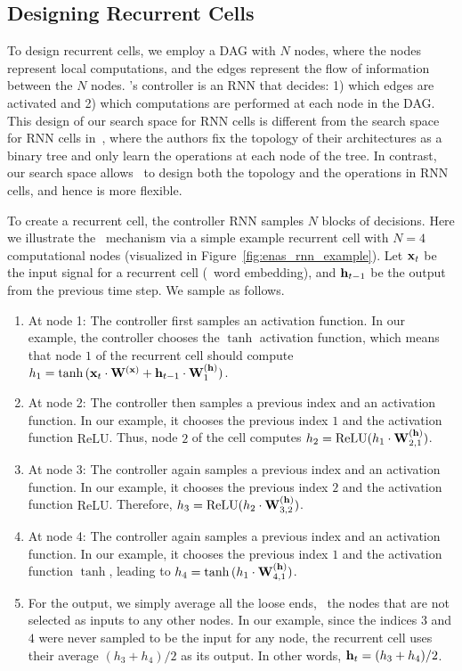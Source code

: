 \subsection{\label{sec:enas_rnn}Designing Recurrent Cells}
To design recurrent cells, we employ a DAG with $N$ nodes, where the nodes represent local computations, and the edges represent the flow of information between the $N$ nodes. \enas's controller is an RNN that decides: 1) which edges are activated and 2) which computations are performed at each node in the DAG. This design of our search space for RNN cells is different from the search space for RNN cells in~\citet{nas}, where the authors fix the topology of their architectures as a binary tree and only learn the operations at each node of the tree. In contrast, our search space allows \enas~to design both the topology and the operations in RNN cells, and hence is more flexible.

To create a recurrent cell, the controller RNN samples $N$ blocks of decisions. Here we illustrate the \enas~mechanism via a simple example recurrent cell with $N = 4$ computational nodes (visualized in Figure~\ref{fig:enas_rnn_example}). Let $\mathbf{x}_t$ be the input signal for a recurrent cell (\eg~word embedding), and $\mathbf{h}_{t-1}$ be the output from the previous time step. We sample as follows.
\begin{enumerate}
  \small
  \item At node 1: The controller first samples an activation function. In our example, the controller chooses the $\tanh$ activation function, which means that node $1$ of the recurrent cell should compute $h_1 = \tanh{(\mathbf{x}_t \cdot \mathbf{W}^{(\mathbf{x})} + \mathbf{h}_{t-1} \cdot \mathbf{W}^{(\mathbf{h})}_1)}$.
  \item At node 2: The controller then samples a previous index and an activation function. In our example, it chooses the previous index $1$ and the activation function $\text{ReLU}$. Thus, node $2$ of the cell computes $h_2 = \text{ReLU}(h_1 \cdot \mathbf{W}^{(\mathbf{h})}_{2, 1})$.
  \item At node 3: The controller again samples a previous index and an activation function. In our example, it chooses the previous index $2$ and the activation function $\text{ReLU}$. Therefore, $h_3 = \text{ReLU}(h_2 \cdot \mathbf{W}^{(\mathbf{h})}_{3, 2})$.
  \item At node 4: The controller again samples a previous index and an activation function. In our example, it chooses the previous index $1$ and the activation function $\tanh$, leading to $h_4 = \tanh{(h_1 \cdot \mathbf{W}^{(\mathbf{h})}_{4, 1})}$.
  \item For the output, we simply average all the loose ends, \ie~the nodes that are not selected as inputs to any other nodes. In our example, since the indices $3$ and $4$ were never sampled to be the input for any node, the recurrent cell uses their average $(h_3 + h_4) / 2$ as its output. In other words, $\mathbf{h}_t = (h_3 + h_4) / 2$.
\end{enumerate}


